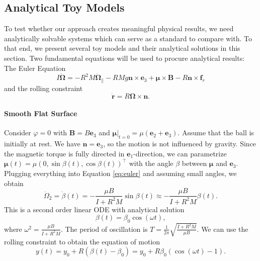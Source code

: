 \subsection{Analytical Toy Models}
\label{subsec:antoy}
To test whether our approach creates meaningful physical results, we need analytically solvable systems which can serve as a standard to compare with. To that end, we present several toy models and their analytical solutions in this section. Two fundamental equations will be used to procure analytical results: The Euler Equation
\begin{equation}
    \label{eq:euler}
    I \dot{\bm{\Omega}} = -R^2 M \dot{\bm{\Omega}}_\| - RMg \bm{n} \times \bm{e}_3 + \bm{\mu} \times \bm{B} - R \bm{n} \times \bm{f}_r
\end{equation}
and the rolling constraint
\begin{equation}
    \label{eq:rolling}
    \dot{\bm{r}}=R\bm{\Omega}\times \bm{n}.
\end{equation}
\paragraph*{Smooth Flat Surface}
Consider $\varphi =0$ with $\bm{B}=B\bm{e}_3$ and $\bm{\mu}|_{t=0}=\mu (\bm{e}_2+\bm{e}_3)$. Assume that the ball is initially at rest. We have $\bm{n}=\bm{e}_3$, so the motion is not influenced by gravity. Since the magnetic torque is fully directed in $\bm{e}_1$-direction, we can parametrize $\bm{\mu}(t)=\mu(0,\sin \beta (t),\cos \beta (t))^\top$ with the angle $\beta$ between $\bm{\mu}$ and $\bm{e}_3$. Plugging everything into Equation \ref{eq:euler} and assuming small angles, we obtain \[
    \ddot{\Omega}_2 = \ddot{\beta}(t)= - \frac{\mu B}{I+R^2M} \sin \beta (t) \approx - \frac{\mu B}{I+R^2M} \beta(t)
    .\] 
This is a second order linear ODE with analytical solution \[
\beta(t)=\beta_0\cos(\omega t)
,\] where $\omega^2 = \frac{\mu B}{I+R^2M}$. The period of oscillation is $T=\frac{1}{2\pi} \sqrt{\frac{I+R^2M}{\mu B}}$. We can use the rolling constraint to obtain the equation of motion \[
y(t)=y_0 + R (\beta(t) - \beta_0) = y_0 + R \beta_0(\cos(\omega t)-1)
.\] 
